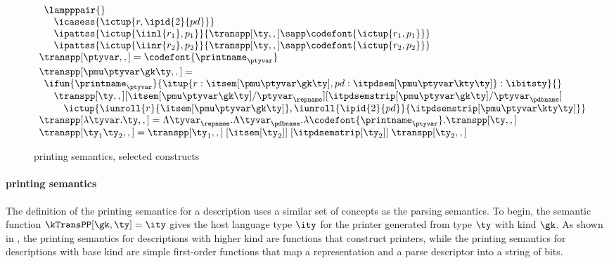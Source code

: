 \begin{figure}
\[\begin{array}{l}
  \begin{array}{l}  
  \lampppair{} \\
  \quad \icasess {\ictup{r,\ipid{2}{pd}}} \\
  \quad \ipattss{\ictup{\iinl{r_1}, p_1}} 
	{ {\transpp[\ty,,]} \sapp \codefont{\ictup{r_1,p_1}}}\\
  \quad \ipattss{\ictup{\iinr{r_2}, p_2}} 
	{ {\transpp[\ty,,]} \sapp \codefont{\ictup{r_2,p_2}}}\\
  \end{array}
\\[3pt]
\transpp[\ptyvar,,] = \codefont{\printname_\ptyvar}
\\[3pt]
\transpp[\pmu \ptyvar \gk \ty,,] = \\
  \begin{array}{l}
  \ifun {\printname_\ptyvar} {\itup{r:\itsem[\pmu \ptyvar \gk \ty], pd:\itpdsem[\pmu \ptyvar \kty \ty]}
                     : \ibitsty} {}\\
  \quad \transpp[\ty,,][\itsem[\pmu \ptyvar \gk \ty]/\ptyvar_\repname]
          [\itpdsemstrip[\pmu \ptyvar \gk \ty]/\ptyvar_\pdbname] \\
  \qquad\ictup{\iunroll{r}{\itsem[\pmu \ptyvar \gk \ty]},
     \iunroll{\ipid{2}{pd}}{\itpdsemstrip[\pmu \ptyvar \kty \ty]}}
  \end{array}  
\\[3pt]
\transpp[\lambda\tyvar . \ty,,] = %
    \Lambda \tyvar_\repname. 
    \Lambda \tyvar_\pdbname. \lambda \codefont{\printname_\ptyvar}. \transpp[\ty,,]
\\
\transpp[\ty_1 \ty_2,,] = 
    \transpp[\ty_1,,]\; [\itsem[\ty_2]]\; [\itpdsemstrip[\ty_2]]\; \transpp[\ty_2,,]
\\
\end{array}
\]
\caption{\ddc{} printing semantics, selected constructs}
\label{fig:ddc-print-sem}
\end{figure}


\paragraph*{\ddc{} printing semantics}
\label{sec:print-sem}
The definition of the printing semantics for a \ddc{} description
uses a similar set of concepts as the parsing semantics.  To begin,
the semantic function $\kTransPP[\gk,\ty] = \ity$ gives the
host language type $\ity$ for the printer generated from type $\ty$
with kind $\gk$.  As shown in ,
the printing semantics for descriptions with higher kind are functions that
construct printers, while the printing semantics for descriptions with base kind
are simple first-order functions that map a representation and a
parse descriptor into a string of bits.

